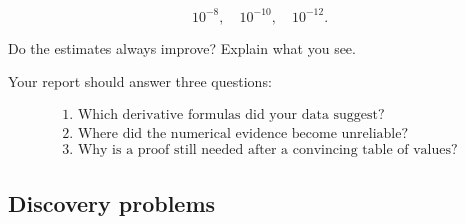 \[
10^{-8},\quad 10^{-10},\quad 10^{-12}.
\]

Do the estimates always improve?  Explain what you see.

Your report should answer three questions:

\[
\begin{array}{l}
\text{1. Which derivative formulas did your data suggest?}\\
\text{2. Where did the numerical evidence become unreliable?}\\
\text{3. Why is a proof still needed after a convincing table of values?}
\end{array}
\]

\subsection{Discovery problems}
\label{subsec:chapter-5-discovery-problems}


